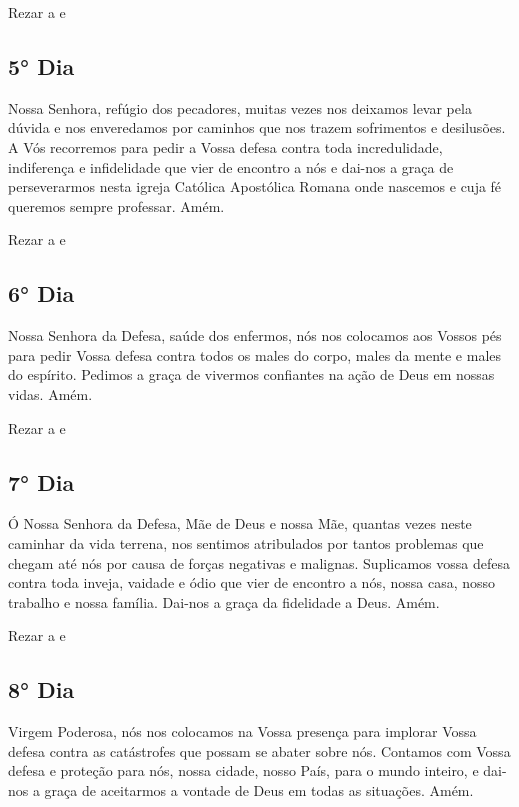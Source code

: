 \documentclass[a4paper,14pt]{extarticle} \usepackage[utf8]{inputenc}
\begin{document}
Rezar a \textbf{} e \textbf{}


\subsection{5° Dia}

Nossa Senhora, refúgio dos pecadores, muitas vezes nos deixamos levar pela dúvida e nos enveredamos por caminhos que nos trazem sofrimentos e desilusões. A Vós recorremos para pedir a Vossa defesa contra toda incredulidade, indiferença e infidelidade que vier de encontro a nós e dai-nos a graça de perseverarmos nesta igreja Católica Apostólica Romana onde nascemos e cuja fé queremos sempre professar. Amém.

Rezar a \textbf{} e \textbf{}


\subsection{6° Dia}

Nossa Senhora da Defesa, saúde dos enfermos, nós nos colocamos aos Vossos pés para pedir Vossa defesa contra todos os males do corpo, males da mente e males do espírito. Pedimos a graça de vivermos confiantes na ação de Deus em nossas vidas. Amém.

Rezar a \textbf{} e \textbf{}


\subsection{7° Dia}

Ó Nossa Senhora da Defesa, Mãe de Deus e nossa Mãe, quantas vezes neste caminhar da vida terrena, nos sentimos atribulados por tantos problemas que chegam até nós por causa de forças negativas e malignas. Suplicamos vossa defesa contra toda inveja, vaidade e ódio que vier de encontro a nós, nossa casa, nosso trabalho e nossa família. Dai-nos a graça da fidelidade a Deus. Amém.

Rezar a \textbf{} e \textbf{}


\subsection{8° Dia}

Virgem Poderosa, nós nos colocamos na Vossa presença para implorar Vossa defesa contra as catástrofes que possam se abater sobre nós. Contamos com Vossa defesa e proteção para nós, nossa cidade, nosso País, para o mundo inteiro, e dai-nos a graça de aceitarmos a vontade de Deus em todas as situações. Amém.
\end{document}
